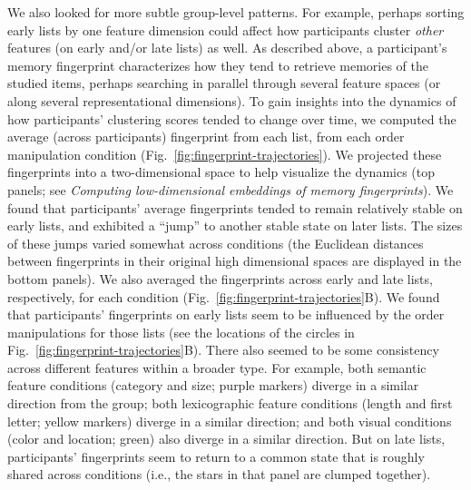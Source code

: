 \documentclass[11pt]{article}
\begin{document}
We also looked for more subtle group-level patterns. For example, perhaps
sorting early lists by one feature dimension could affect how participants
cluster \textit{other} features (on early and/or late lists) as well. As
described above, a participant's memory fingerprint characterizes how they tend
to retrieve memories of the studied items, perhaps searching in parallel
through several feature spaces (or along several representational dimensions).
To gain insights into the dynamics of how participants' clustering scores
tended to change over time, we computed the average (across participants)
fingerprint from each list, from each order manipulation condition
(Fig.~\ref{fig:fingerprint-trajectories}). We projected these fingerprints into
a two-dimensional space to help visualize the dynamics (top panels; see
\textit{Computing low-dimensional embeddings of memory fingerprints}). We found
that participants' average fingerprints tended to remain relatively stable on
early lists, and exhibited a ``jump'' to another stable state on later lists.
The sizes of these jumps varied somewhat across conditions (the Euclidean
distances between fingerprints in their original high dimensional spaces are
displayed in the bottom panels). We also averaged the fingerprints across early
and late lists, respectively, for each condition
(Fig.~\ref{fig:fingerprint-trajectories}B). We found that participants'
fingerprints on early lists seem to be influenced by the order manipulations
for those lists (see the locations of the circles in
Fig.~\ref{fig:fingerprint-trajectories}B). There also seemed to be some
consistency across different features within a broader type. For example, both
semantic feature conditions (category and size; purple markers) diverge in a
similar direction from the group; both lexicographic feature conditions (length
and first letter; yellow markers) diverge in a similar direction; and both
visual conditions (color and location; green) also diverge in a similar
direction. But on late lists, participants' fingerprints seem to return to a
common state that is roughly shared across conditions (i.e., the stars in that
panel are clumped together).
\end{document}
